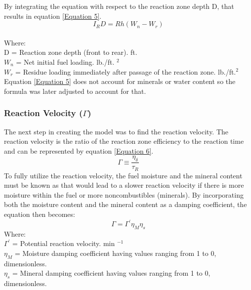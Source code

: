 \documentclass{article}
\begin{document}
\indent By integrating the equation with respect to the reaction zone depth D, that results in equation \ref{Equation 5}.
\begin{equation}
	\label{Equation 5}
	I_R D = Rh (W_n - W_r)
\end{equation}\\
Where: \\
D = Reaction zone depth (front to rear). ft. \\
$W_n$ = Net initial fuel loading. lb./ft. $^2$ \\
$W_r$ = Residue loading immediately after passage of the reaction zone. lb./ft.$^2$ \\
\indent Equation \ref{Equation 5} does not account for minerals or water content so the formula was later adjusted to account for that. \\
\subsubsection{Reaction Velocity ($\Gamma$)}
\indent The next step in creating the model was to find the reaction velocity. The reaction velocity is the ratio of the reaction zone efficiency to the reaction time and can be represented by equation \ref{Equation 6}.
\begin{equation}
	\label{Equation 6}
	\Gamma \equiv \frac {\eta _ \delta} {\tau _ R}
\end{equation}
\indent To fully utilize the reaction velocity, the fuel moisture and the mineral content must be known as that would lead to a slower reaction velocity if there is more moisture within the fuel or more noncombustibles (minerals). By incorporating both the moisture content and the mineral content as a damping coefficient, the equation then becomes: 
\begin{equation}
	\label{Equation 7}
	\Gamma = \Gamma ^ {'} \eta _ M \eta _ s
\end{equation}
Where: \\
 $\Gamma ^ {'}$ = Potential reaction velocity. min $^ {-1}$ \\ 
 $\eta _ M$ = Moisture damping coefficient having values ranging from 1 to 0, dimensionless. \\
 $\eta _ s$ = Mineral damping coefficient having values ranging from 1 to 0, dimensionless. \\
\end{document}
